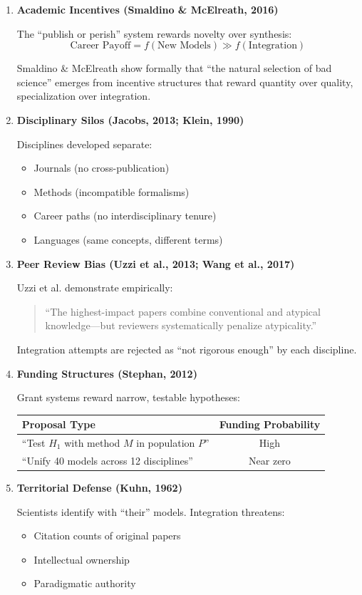 \begin{enumerate}
\item \textbf{Academic Incentives (Smaldino \& McElreath, 2016)}

The ``publish or perish'' system rewards novelty over synthesis:
\begin{equation}
\text{Career Payoff} = f(\text{New Models}) \gg f(\text{Integration})
\end{equation}

Smaldino \& McElreath show formally that ``the natural selection of bad science'' emerges from incentive structures that reward quantity over quality, specialization over integration.

\item \textbf{Disciplinary Silos (Jacobs, 2013; Klein, 1990)}

Disciplines developed separate:
\begin{itemize}[nosep]
\item Journals (no cross-publication)
\item Methods (incompatible formalisms)
\item Career paths (no interdisciplinary tenure)
\item Languages (same concepts, different terms)
\end{itemize}

\item \textbf{Peer Review Bias (Uzzi et al., 2013; Wang et al., 2017)}

Uzzi et al. demonstrate empirically:
\begin{quote}
``The highest-impact papers combine conventional and atypical knowledge---but reviewers systematically penalize atypicality.''
\end{quote}

Integration attempts are rejected as ``not rigorous enough'' by each discipline.

\item \textbf{Funding Structures (Stephan, 2012)}

Grant systems reward narrow, testable hypotheses:
\begin{center}
\begin{tabular}{lc}
\toprule
\textbf{Proposal Type} & \textbf{Funding Probability} \\
\midrule
``Test $H_1$ with method $M$ in population $P$'' & High \\
``Unify 40 models across 12 disciplines'' & Near zero \\
\bottomrule
\end{tabular}
\end{center}

\item \textbf{Territorial Defense (Kuhn, 1962)}

Scientists identify with ``their'' models. Integration threatens:
\begin{itemize}[nosep]
\item Citation counts of original papers
\item Intellectual ownership
\item Paradigmatic authority
\end{itemize}
\end{enumerate}

